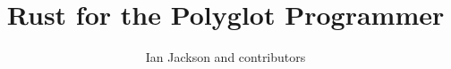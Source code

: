 \documentclass[a4paper]{memoir}
\title{Rust for the Polyglot Programmer}
\author{Ian Jackson and contributors}
\begin{document}
\pagestyle{plain}
\frontmatter

\begin{titlingpage}
  \maketitle
\end{titlingpage}

\tableofcontents

\pagestyle{headings}
\mainmatter















\backmatter

\end{document}
